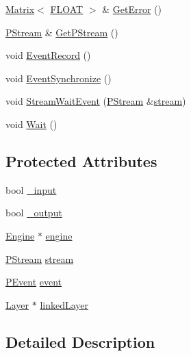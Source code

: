 \begin{DoxyCompactItemize}
\item 
\hyperlink{classfractal_1_1Matrix}{Matrix}$<$ \hyperlink{namespacefractal_a1c2d2530689575d5ccb56bae52af70d3}{F\+L\+O\+A\+T} $>$ \& \hyperlink{classfractal_1_1Probe_aa38a65aec5733dc17757f5d8f2bc9eba}{Get\+Error} ()
\item 
\hyperlink{classfractal_1_1PStream}{P\+Stream} \& \hyperlink{classfractal_1_1Probe_a4cd80fb80b8c8a6fae9bc2e0afa3cc55}{Get\+P\+Stream} ()
\item 
void \hyperlink{classfractal_1_1Probe_a0ee39bdf4e92d6cb8482dffb5b05d1b0}{Event\+Record} ()
\item 
void \hyperlink{classfractal_1_1Probe_a3273f2b6b99cf3971a790fda6bc1ea76}{Event\+Synchronize} ()
\item 
void \hyperlink{classfractal_1_1Probe_a4348ca6db3c7a6ac3145d33a9d4bfcd3}{Stream\+Wait\+Event} (\hyperlink{classfractal_1_1PStream}{P\+Stream} \&\hyperlink{classfractal_1_1Probe_ae26569f9d3f272e044e62839fce87174}{stream})
\item 
void \hyperlink{classfractal_1_1Probe_a999335e1857d0d21155c5316eaf74f3e}{Wait} ()
\end{DoxyCompactItemize}
\subsection*{Protected Attributes}
\begin{DoxyCompactItemize}
\item 
bool \hyperlink{classfractal_1_1Probe_ae30770576d97d498d261568425194dc7}{\+\_\+input}
\item 
bool \hyperlink{classfractal_1_1Probe_acbc689a83084b63d5d774a139e7f99b3}{\+\_\+output}
\item 
\hyperlink{classfractal_1_1Engine}{Engine} $\ast$ \hyperlink{classfractal_1_1Probe_a20487048a2d0f3e33eb4a53dac23dd22}{engine}
\item 
\hyperlink{classfractal_1_1PStream}{P\+Stream} \hyperlink{classfractal_1_1Probe_ae26569f9d3f272e044e62839fce87174}{stream}
\item 
\hyperlink{classfractal_1_1PEvent}{P\+Event} \hyperlink{classfractal_1_1Probe_a09b0d12f41483fd93c6449040ba1f540}{event}
\item 
\hyperlink{classfractal_1_1Layer}{Layer} $\ast$ \hyperlink{classfractal_1_1Probe_a121e11df32602fb8b1864845aa93c3aa}{linked\+Layer}
\end{DoxyCompactItemize}


\subsection{Detailed Description}


